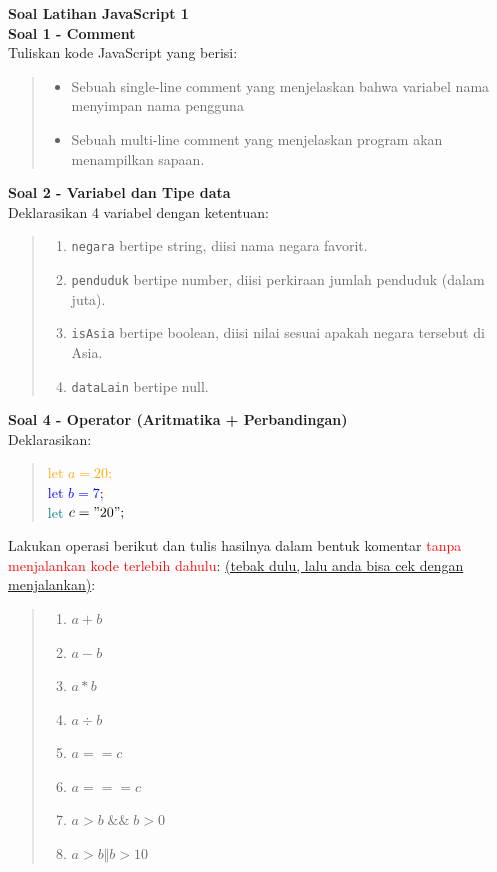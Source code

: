\documentclass[12pt]{article}
\begin{document}
\textbf{Soal Latihan JavaScript 1} \\

\textbf{Soal 1 - Comment} \\

Tuliskan kode JavaScript yang berisi: 
\begin{quote}
\begin{itemize}
\item Sebuah single-line comment yang menjelaskan bahwa variabel nama 
menyimpan nama pengguna
\item Sebuah multi-line comment yang menjelaskan program 
akan menampilkan sapaan.
\end{itemize}
\end{quote}

\textbf{Soal 2 - Variabel dan Tipe data} \\

Deklarasikan 4 variabel dengan ketentuan: 
\begin{quote}
\begin{enumerate}
        \item \verb+negara+ bertipe string, diisi nama negara favorit.
        \item \verb+penduduk+ bertipe number, diisi perkiraan jumlah penduduk (dalam juta).
        \item \verb+isAsia+ bertipe boolean, diisi nilai sesuai apakah negara tersebut di Asia.
        \item \verb+dataLain+ bertipe null.      
\end{enumerate}
\end{quote}

\textbf{Soal 4 - Operator (Aritmatika + Perbandingan)} \\

Deklarasikan:

\begin{quote}
\textcolor{orange}{let ${a = 20;}$} \\


\textcolor{blue}{let ${b = 7;}$} \\ 


\textcolor{teal}{let ${c = "20";}$}

\end{quote} 

Lakukan operasi berikut dan tulis hasilnya dalam bentuk komentar \textcolor{red}{tanpa menjalankan kode terlebih dahulu}: 
\underline{(tebak dulu, lalu anda bisa cek dengan menjalankan)}:
\begin{quote}
\begin{enumerate}
        \item $a + b$
        \item $a - b$
        \item $a \ast b$
        \item $a \div b$
        \item $a == c$
        \item $a === c$
        \item ${a > b} \;\&\&\; {b > 0}$
        \item $a > b \Vert  b > 10$
\end{enumerate}
\end{quote} 
\end{document}

